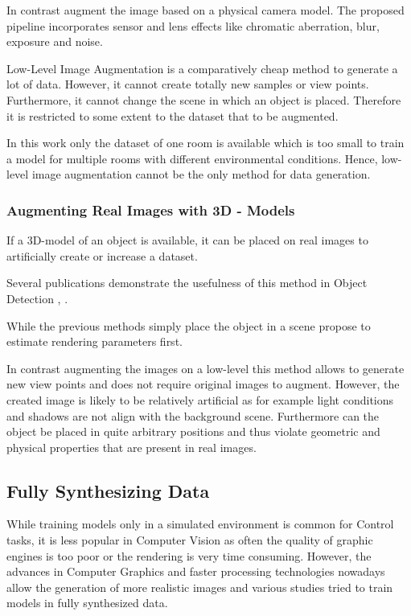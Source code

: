 In contrast \citeauthor{Carlson2018}\cite{Carlson2018} augment the image based on a physical camera model. The proposed pipeline incorporates sensor and lens effects like chromatic aberration, blur, exposure and noise.

Low-Level Image Augmentation is a comparatively cheap method to generate a lot of data. However, it cannot create totally new samples or view points. Furthermore, it cannot change the scene in which an object is placed. Therefore it is restricted to some extent to the dataset that to be augmented.

In this work only the dataset of one room is available which is too small to train a model for multiple rooms with different environmental conditions. Hence, low-level image augmentation cannot be the only method for data generation.

\subsubsection{Augmenting Real Images with 3D - Models}

If a 3D-model of an object is available, it can be placed on real images to artificially create or increase a dataset. 

Several publications demonstrate the usefulness of this method in Object Detection \cite{Girshick2013}, \cite{Peng}.

While the previous methods simply place the object in a scene \citeauthor{Rozantsev} \cite{Rozantsev} propose to estimate rendering parameters first.

In contrast augmenting the images on a low-level this method allows to generate new view points and does not require original images to augment. However, the created image is likely to be relatively artificial as for example light conditions and shadows are not align with the background scene. Furthermore can the object be placed in quite arbitrary positions and thus violate geometric and physical properties that are present in real images. 


\subsection{Fully Synthesizing Data}

\cite{Sadeghi2016,Hinterstoisser2017,Krizhevsky2012a}

While training models only in a simulated environment is common for Control tasks, it is less popular in Computer Vision as often the quality of graphic engines is too poor or the rendering is very time consuming. However, the advances in Computer Graphics and faster processing technologies nowadays allow the generation of more realistic images and various studies tried to train models in fully synthesized data.


